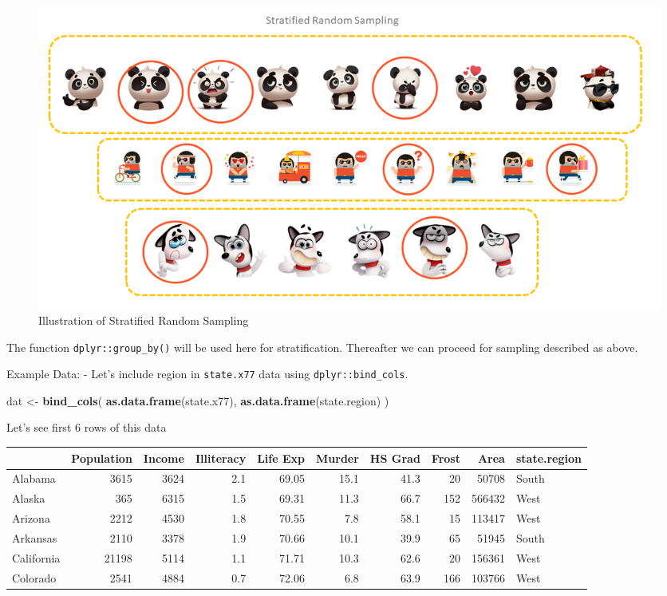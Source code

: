 \documentclass[
]{book}
\newenvironment{Shaded}{\begin{snugshade}}{\end{snugshade}}
\newcommand{\FunctionTok}[1]{\textcolor[rgb]{0.13,0.29,0.53}{\textbf{#1}}}
\newcommand{\NormalTok}[1]{#1}
\newcommand{\OtherTok}[1]{\textcolor[rgb]{0.56,0.35,0.01}{#1}}
\begin{document}
\begin{figure}

{\centering \includegraphics[width=0.99\linewidth]{images/stratified} 

}

\caption{Illustration of Stratified Random Sampling}\label{fig:strata}
\end{figure}

The function \texttt{dplyr::group\_by()} will be used here for stratification. Thereafter we can proceed for sampling described as above.

Example Data: - Let's include region in \texttt{state.x77} data using \texttt{dplyr::bind\_cols}.

\begin{Shaded}
\begin{Highlighting}[]
\NormalTok{dat }\OtherTok{\textless{}{-}} \FunctionTok{bind\_cols}\NormalTok{(}
  \FunctionTok{as.data.frame}\NormalTok{(state.x77),}
  \FunctionTok{as.data.frame}\NormalTok{(state.region)}
\NormalTok{)}
\end{Highlighting}
\end{Shaded}

Let's see first 6 rows of this data

\begin{tabular}{l|r|r|r|r|r|r|r|r|l}
\hline
  & Population & Income & Illiteracy & Life Exp & Murder & HS Grad & Frost & Area & state.region\\
\hline
Alabama & 3615 & 3624 & 2.1 & 69.05 & 15.1 & 41.3 & 20 & 50708 & South\\
\hline
Alaska & 365 & 6315 & 1.5 & 69.31 & 11.3 & 66.7 & 152 & 566432 & West\\
\hline
Arizona & 2212 & 4530 & 1.8 & 70.55 & 7.8 & 58.1 & 15 & 113417 & West\\
\hline
Arkansas & 2110 & 3378 & 1.9 & 70.66 & 10.1 & 39.9 & 65 & 51945 & South\\
\hline
California & 21198 & 5114 & 1.1 & 71.71 & 10.3 & 62.6 & 20 & 156361 & West\\
\hline
Colorado & 2541 & 4884 & 0.7 & 72.06 & 6.8 & 63.9 & 166 & 103766 & West\\
\hline
\end{tabular}
\end{document}
